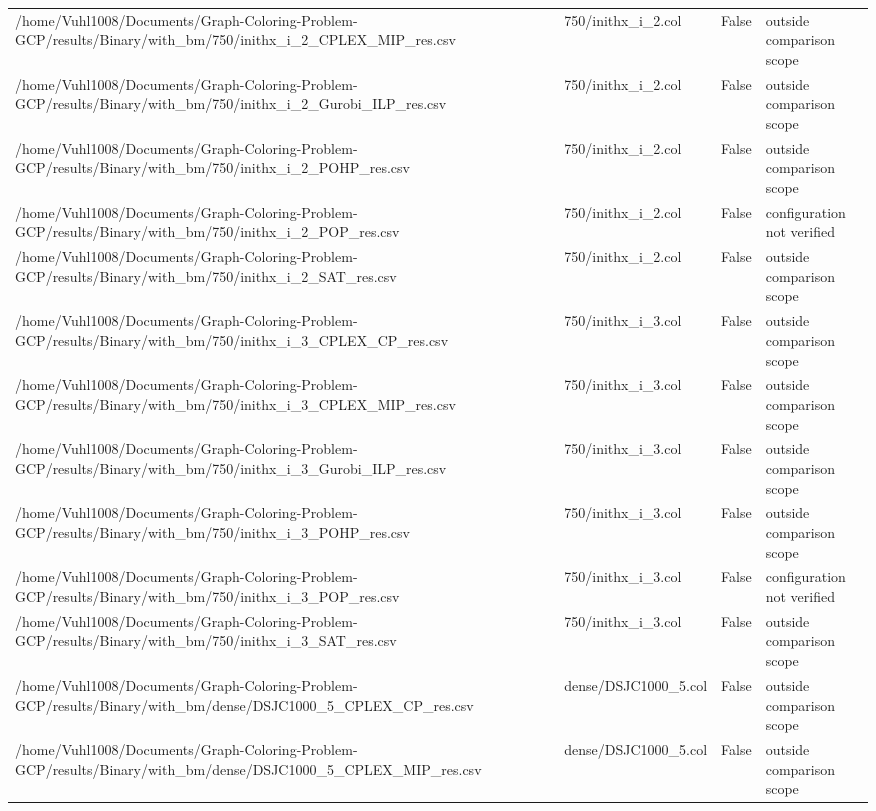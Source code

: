 \begin{table}[htbp]
\begin{tabular}{llll}
/home/Vuhl1008/Documents/Graph-Coloring-Problem-GCP/results/Binary/with\_bm/750/inithx\_i\_2\_CPLEX\_MIP\_res.csv & 750/inithx\_i\_2.col & False & outside comparison scope \\
/home/Vuhl1008/Documents/Graph-Coloring-Problem-GCP/results/Binary/with\_bm/750/inithx\_i\_2\_Gurobi\_ILP\_res.csv & 750/inithx\_i\_2.col & False & outside comparison scope \\
/home/Vuhl1008/Documents/Graph-Coloring-Problem-GCP/results/Binary/with\_bm/750/inithx\_i\_2\_POHP\_res.csv & 750/inithx\_i\_2.col & False & outside comparison scope \\
/home/Vuhl1008/Documents/Graph-Coloring-Problem-GCP/results/Binary/with\_bm/750/inithx\_i\_2\_POP\_res.csv & 750/inithx\_i\_2.col & False & configuration not verified \\
/home/Vuhl1008/Documents/Graph-Coloring-Problem-GCP/results/Binary/with\_bm/750/inithx\_i\_2\_SAT\_res.csv & 750/inithx\_i\_2.col & False & outside comparison scope \\
/home/Vuhl1008/Documents/Graph-Coloring-Problem-GCP/results/Binary/with\_bm/750/inithx\_i\_3\_CPLEX\_CP\_res.csv & 750/inithx\_i\_3.col & False & outside comparison scope \\
/home/Vuhl1008/Documents/Graph-Coloring-Problem-GCP/results/Binary/with\_bm/750/inithx\_i\_3\_CPLEX\_MIP\_res.csv & 750/inithx\_i\_3.col & False & outside comparison scope \\
/home/Vuhl1008/Documents/Graph-Coloring-Problem-GCP/results/Binary/with\_bm/750/inithx\_i\_3\_Gurobi\_ILP\_res.csv & 750/inithx\_i\_3.col & False & outside comparison scope \\
/home/Vuhl1008/Documents/Graph-Coloring-Problem-GCP/results/Binary/with\_bm/750/inithx\_i\_3\_POHP\_res.csv & 750/inithx\_i\_3.col & False & outside comparison scope \\
/home/Vuhl1008/Documents/Graph-Coloring-Problem-GCP/results/Binary/with\_bm/750/inithx\_i\_3\_POP\_res.csv & 750/inithx\_i\_3.col & False & configuration not verified \\
/home/Vuhl1008/Documents/Graph-Coloring-Problem-GCP/results/Binary/with\_bm/750/inithx\_i\_3\_SAT\_res.csv & 750/inithx\_i\_3.col & False & outside comparison scope \\
/home/Vuhl1008/Documents/Graph-Coloring-Problem-GCP/results/Binary/with\_bm/dense/DSJC1000\_5\_CPLEX\_CP\_res.csv & dense/DSJC1000\_5.col & False & outside comparison scope \\
/home/Vuhl1008/Documents/Graph-Coloring-Problem-GCP/results/Binary/with\_bm/dense/DSJC1000\_5\_CPLEX\_MIP\_res.csv & dense/DSJC1000\_5.col & False & outside comparison scope \\

\end{tabular}
\end{table}
